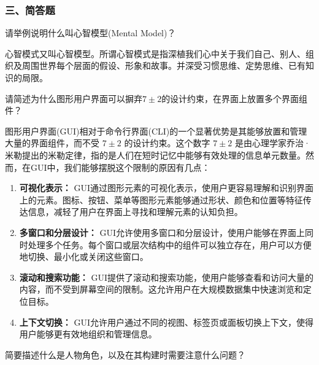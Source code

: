 \subsubsection*{三、简答题}
\setcounter{problemname}{0}

\begin{problem}
请举例说明什么叫心智模型(Mental Model)？
\end{problem}

\begin{solution}
心智模式又叫心智模型。所谓心智模式是指深植我们心中关于我们自己、别人、组织及周围世界每个层面的假设、形象和故事。并深受习惯思维、定势思维、已有知识的局限。
\end{solution}



\begin{problem}
请简述为什么图形用户界面可以摒弃$7 \pm 2$的设计约束，在界面上放置多个界面组件？
\end{problem}

\begin{solution}
图形用户界面(GUI)相对于命令行界面(CLI)的一个显著优势是其能够放置和管理大量的界面组件，而不受 $7 \pm 2$ 的设计约束。这个数字 $7 \pm 2$ 是由心理学家乔治·米勒提出的米勒定律，指的是人们在短时记忆中能够有效处理的信息单元数量。然而，在GUI中，我们能够摆脱这个限制的原因有几点：

\begin{enumerate}[label=\arabic*.]
    \item \textbf{可视化表示：} GUI通过图形元素的可视化表示，使用户更容易理解和识别界面上的元素。图标、按钮、菜单等图形元素能够通过形状、颜色和位置等特征传达信息，减轻了用户在界面上寻找和理解元素的认知负担。
    \item \textbf{多窗口和分层设计：} GUI允许使用多窗口和分层设计，使用户能够在界面上同时处理多个任务。每个窗口或层次结构中的组件可以独立存在，用户可以方便地切换、最小化或关闭这些窗口。
    \item \textbf{滚动和搜索功能：} GUI提供了滚动和搜索功能，使用户能够查看和访问大量的内容，而不受到屏幕空间的限制。这允许用户在大规模数据集中快速浏览和定位目标。
    \item \textbf{上下文切换：} GUI允许用户通过不同的视图、标签页或面板切换上下文，使得用户能够更有效地组织和管理信息。
\end{enumerate}
\end{solution}



\begin{problem}
简要描述什么是人物角色，以及在其构建时需要注意什么问题？
\end{problem}

